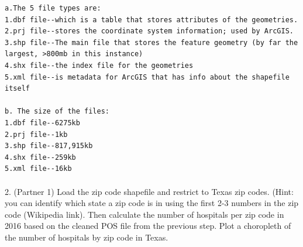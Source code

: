 \documentclass[
  letterpaper,
  DIV=11,
  numbers=noendperiod]{scrartcl}
\makeatletter
\let\oldparagraph\paragraph
\renewcommand{\paragraph}{
    \@ifstar
      \xxxParagraphStar
      \xxxParagraphNoStar
  }
\newcommand{\xxxParagraphStar}[1]{\oldparagraph*{#1}\mbox{}}
\newcommand{\xxxParagraphNoStar}[1]{\oldparagraph{#1}\mbox{}}
\makeatother
\begin{document}
\begin{verbatim}
a.The 5 file types are: 
1.dbf file--which is a table that stores attributes of the geometries. 
2.prj file--stores the coordinate system information; used by ArcGIS.
3.shp file--The main file that stores the feature geometry (by far the largest, >800mb in this instance)
4.shx file--the index file for the geometries
5.xml file--is metadata for ArcGIS that has info about the shapefile itself

b. The size of the files:
1.dbf file--6275kb
2.prj file--1kb
3.shp file--817,915kb
4.shx file--259kb
5.xml file--16kb
\end{verbatim}

\paragraph{2. (Partner 1) Load the zip code shapefile and restrict to
Texas zip codes. (Hint: you can identify which state a zip code is in
using the first 2-3 numbers in the zip code (Wikipedia link). Then
calculate the number of hospitals per zip code in 2016 based on the
cleaned POS file from the previous step. Plot a choropleth of the number
of hospitals by zip code in
Texas.}\label{partner-1-load-the-zip-code-shapefile-and-restrict-to-texas-zip-codes.-hint-you-can-identify-which-state-a-zip-code-is-in-using-the-first-2-3-numbers-in-the-zip-code-wikipedia-link.-then-calculate-the-number-of-hospitals-per-zip-code-in-2016-based-on-the-cleaned-pos-file-from-the-previous-step.-plot-a-choropleth-of-the-number-of-hospitals-by-zip-code-in-texas.}
\end{document}
